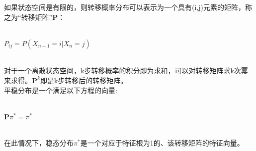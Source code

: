 \begin{frame}
	如果状态空间是有限的，则转移概率分布可以表示为一个具有(i,j)元素的矩阵，称之为“转移矩阵”$\mathbf{P}$：
	~\\
	~\\
	\centerline{$P_{ij}=P(X_{n+1}=i|X_n=j)$}
	~\\
	对于一个离散状态空间，k步转移概率的积分即为求和，可以对转移矩阵求k次幂来求得。$\mathbf{P}^k$即是k步转移后的转移矩阵。\\平稳分布是一个满足以下方程的向量:
	~\\
	~\\
	\centerline{$\mathbf{P}\pi^*=\pi^*$}
	~\\
	在此情况下，稳态分布$\pi^*$是一个对应于特征根为1的、该转移矩阵的特征向量。
\end{frame}
